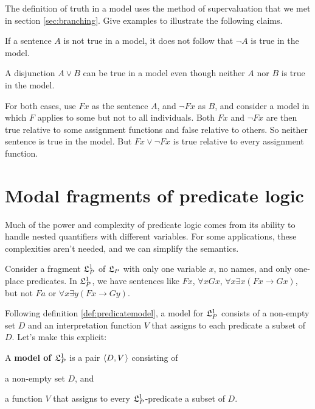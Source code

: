 \begin{exercise}
  The definition of truth in a model uses the method of supervaluation
  that we met in section \ref{sec:branching}. Give examples to illustrate the
  following claims.
  
  \begin{exlist}
  \item If a sentence $A$ is not true in a model, it does not follow that
    $\neg A$ is true in the model.
  \item A disjunction $A \lor B$ can be true in a model even though neither $A$
    nor $B$ is true in the model. 
  \end{exlist}
\end{exercise}
\begin{solution}
  For both cases, use $Fx$ as the sentence $A$, and $\neg Fx$ as $B$, and
  consider a model in which $F$ applies to some but not to all individuals. Both
  $Fx$ and $\neg Fx$ are then true relative to some assignment functions and
  false relative to others. So neither sentence is true in the model. But
  $Fx \lor \neg Fx$ is true relative to every assignment function.
\end{solution}

\section{Modal fragments of predicate logic}
\label{sec:fragment}

Much of the power and complexity of predicate logic comes from its ability to
handle nested quantifiers with different variables. For some applications, these
complexities aren't needed, and we can simplify the semantics.

Consider a fragment $\mathfrak{L}_P^1$ of $\mathfrak{L}_P$ with only one variable $x$, no names, and
only one-place predicates. In $\mathfrak{L}_P^1$, we have sentences like $Fx$,
$\forall x Gx$, $\forall x \exists x (Fx \to Gx)$, but not $Fa$ or
$\forall x \exists y(Fx \to Gy)$.

Following definition \ref{def:predicatemodel}, a model for $\mathfrak{L}_P^1$ consists of
a non-empty set $D$ and an interpretation function $V$ that assigns to each
predicate a subset of $D$. Let's make this explicit:

\begin{justabox}
  A \textbf{model of $\mathfrak{L}_P^1$} is a pair $\t{D,V}$
  consisting of \vspace{-1mm}
  \begin{itemize*}
  \item a non-empty set $D$, and
  \item a function $V$ that assigns to every $\mathfrak{L}_P^1$-predicate a subset of $D$.
  \end{itemize*}
\end{justabox}

